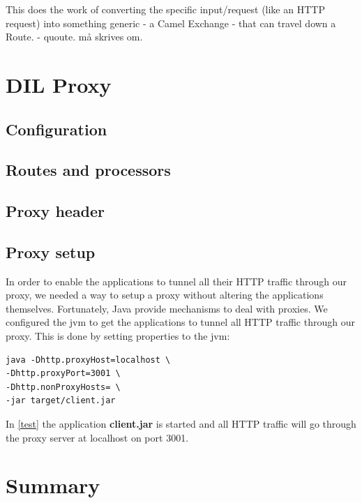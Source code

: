 This does the work of converting the specific input/request (like an HTTP
request) into something generic - a Camel Exchange - that can travel down a
Route.
 - quoute. må skrives om.


\section{DIL Proxy}

\subsection{Configuration}


\subsection{Routes and processors}

\subsection{Proxy header}

\subsection{Proxy setup}

In order to enable the applications to tunnel all their HTTP traffic through our
proxy, we needed a way to setup a proxy without altering the applications
themselves. Fortunately, Java provide mechanisms to deal with
proxies\cite{oracle-proxy}. We configured the \gls{jvm} to get the applications
to tunnel all HTTP traffic through our proxy. This is done by setting properties
to the \gls{jvm}:


\begin{lstlisting}[frame=single, caption="Setting a proxy on the \gls{jvm}", label=test]
java -Dhttp.proxyHost=localhost \
-Dhttp.proxyPort=3001 \
-Dhttp.nonProxyHosts= \
-jar target/client.jar
\end{lstlisting}

In \cref{test} the application \textbf{client.jar} is started and all HTTP
traffic will go through the proxy server at localhost on port 3001.


\section{Summary}
